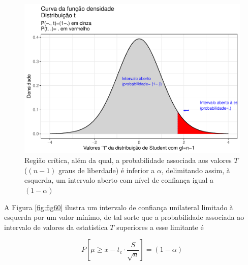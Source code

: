 \documentclass[
]{book}
\begin{document}
\begin{figure}

{\centering \includegraphics[width=1\linewidth]{apostila_files/figure-latex/fig59-1} 

}

\caption{Região crítica, além da qual, a probabilidade associada aos valores $T$ ($(n-1)$ graus de liberdade)  é inferior a $\alpha$, delimitando assim, à esquerda, um intervalo aberto com nível de confiança igual a $(1-\alpha)$}\label{fig:fig59}
\end{figure}

\hfill\break

A Figura \ref{fig:fig60} ilustra um intervalo de confiança unilateral limitado à esquerda por um valor mínimo, de tal sorte que a probabilidade associada ao intervalo de valores da estatística \(T\) superiores a esse limitante é

\hfill\break

\[
P\left [\mu \ge \bar{x} - {t}_{c} \cdot  \frac{S}{\sqrt{n}} \right ] = (1- \alpha)
\]

\hfill\break
\end{document}
